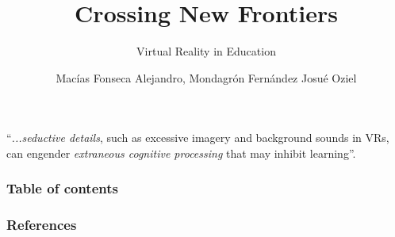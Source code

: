 \documentclass[aspectratio=169]{beamer}
\title[VR in Education]{Crossing New Frontiers}
\subtitle{Virtual Reality in Education}
\author{Macías Fonseca Alejandro, Mondagrón Fernández Josué Oziel}
\institute[FIF UAQ]{Facultad de Informática \\ Universidad Autónoma de Querétaro }
\begin{document}
\begin{frame}
      \huge “\textit{...seductive details}, such as excessive imagery and background sounds in VRs, can engender \textit{extraneous cognitive processing} that may inhibit learning”.\parencite{OJE2023100033}
   \end{frame}
\frame{\titlepage}
\begin{frame}
   \frametitle{Table of contents}
   \tableofcontents
\end{frame}
\begin{frame}
   \frametitle{References}
   \nocite{mondragon2023}
   \printbibliography
\end{frame}
\end{document}

